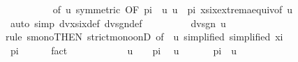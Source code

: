\begin{isabellebody}
\ \ \ \ \ \ \ \ \isamarkupfalse%
\ {\isacharasterisk}{\kern0pt}{\isacharbrackleft}{\kern0pt}of\ u{\isacharcomma}{\kern0pt}\ symmetric{\isacharcomma}{\kern0pt}\ OF\ {\isacartoucheopen}{}{\isacharslash}{\kern0pt}{\isacharparenleft}{\kern0pt}{}{\isacharasterisk}{\kern0pt}pi{\isacharparenright}{\kern0pt}\ {\isacharless}{\kern0pt}\ u{\isacartoucheclose}\ {\isacartoucheopen}u\ {\isacharless}{\kern0pt}\ {}{\isacharslash}{\kern0pt}pi{\isacartoucheclose}{\isacharbrackright}{\kern0pt}\ xsix{\isacharunderscore}{\kern0pt}extrema{\isacharunderscore}{\kern0pt}equiv{\isacharbrackleft}{\kern0pt}of\ u{\isacharbrackright}{\kern0pt}\isanewline
\ \ \ \ \ \ \ \ \isamarkupfalse%
\ {\isacharparenleft}{\kern0pt}auto\ simp{\isacharcolon}{\kern0pt}\ dvxsix{\isacharunderscore}{\kern0pt}def\ dvsgn{\isacharunderscore}{\kern0pt}def{\isacharparenright}{\kern0pt}\isanewline
\ \ \ \ \ \ \isamarkupfalse%
\ \isamarkupfalse%
\ {\isachardoublequoteopen}dvsgn\ {\isacharparenleft}{\kern0pt}{}{\isacharslash}{\kern0pt}u{\isacharparenright}{\kern0pt}\ {\isachargreater}{\kern0pt}\ {}{\isachardoublequoteclose}\isanewline
\ \ \ \ \ \ \isamarkupfalse%
{\isacharparenleft}{\kern0pt}rule\ smono{\isacharbrackleft}{\kern0pt}THEN\ strict{\isacharunderscore}{\kern0pt}mono{\isacharunderscore}{\kern0pt}onD{\isacharcomma}{\kern0pt}\ of\ {\isasymxi}\ {\isachardoublequoteopen}{}{\isacharslash}{\kern0pt}u{\isachardoublequoteclose}{\isacharcomma}{\kern0pt}\ simplified{\isacharcomma}{\kern0pt}\ simplified\ xi{\isacharparenleft}{\kern0pt}{}{\isacharparenright}{\kern0pt}{\isacharbrackright}{\kern0pt}{\isacharparenright}{\kern0pt}\isanewline
\ \ \ \ \ \ \ \ \isamarkupfalse%
\ {\isachardoublequoteopen}pi\ {\isacharless}{\kern0pt}\ {\isasymxi}\ {\isacharasterisk}{\kern0pt}\ {}{\isachardoublequoteclose}\ \isamarkupfalse%
\ fact\isanewline
\ \ \ \ \ \ \ \ \isamarkupfalse%
\ {\isachardoublequoteopen}{}\ {\isacharslash}{\kern0pt}\ u\ {\isacharless}{\kern0pt}\ {}\ {\isacharasterisk}{\kern0pt}\ pi{\isachardoublequoteclose}\ \isamarkupfalse%
\ {\isacartoucheopen}u\ {\isachargreater}{\kern0pt}\ {}{\isacartoucheclose}\ {\isacartoucheopen}{}\ {\isacharslash}{\kern0pt}\ {\isacharparenleft}{\kern0pt}{}\ {\isacharasterisk}{\kern0pt}\ pi{\isacharparenright}{\kern0pt}\ {\isacharless}{\kern0pt}\ u{\isacartoucheclose}\ \isamarkupfalse%

\end{isabellebody}
